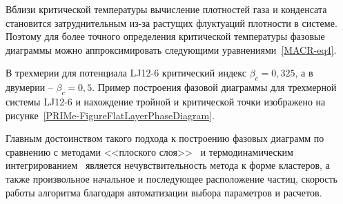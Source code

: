 \begin{table}[h!]
  \caption{Значения тройных и критических точек, а также коэффициентов фитирования $A$ и $a$ из уравнений \eqref{MACR-eq4} для двумерных и трехмерных систем Леннарда-Джонса, рассматриваемых в данной работе.}
  \label{PRIMe-Table2}
\end{table}



Вблизи критической температуры вычисление плотностей газа и конденсата становится затруднительным из-за растущих флуктуаций плотности в системе.
Поэтому для более точного определения критической температуры фазовые диаграммы можно аппроксимировать следующими уравнениями~\ref{MACR-eq4}.

В трехмерии для потенциала LJ12-6 критический индекс $\beta_c = 0{,}325$, а в двумерии -- $\beta_c = 0{,}5$.
Пример построения фазовой диаграммы для трехмерной системы LJ12-6 и нахождение тройной и критической точки изображено на рисунке~\ref{PRIMe-FigureFlatLayerPhaseDiagram}.

Главным достоинством такого подхода к построению фазовых диаграмм по сравнению с методами <<плоского слоя>>~\cite{10.1021/jp806127j, 10.1021/jp1117213} и термодинамическим интегрированием~\cite{10.1088/0953-8984/21/46/465104} является нечувствительность метода к форме кластеров, а также произвольное начальное и последующее расположение частиц, скорость работы алгоритма благодаря автоматизации выбора параметров и расчетов.



